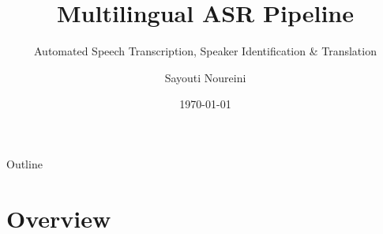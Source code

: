 \documentclass[aspectratio=169, 11pt]{beamer}
\title[ASR Pipeline]{Multilingual ASR Pipeline}
\subtitle{Automated Speech Transcription, Speaker Identification \& Translation}
\author{Sayouti Noureini}
\date{\today}
\institute{Work in Progress}
\begin{document}
\begin{frame}[plain]
    \titlepage
\end{frame}

\begin{frame}{Outline}
    \tableofcontents
\end{frame}

\section{Overview}
\end{document}
